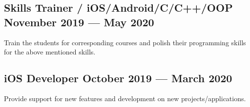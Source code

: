 \documentclass[letter,10pt]{article}
\begin{document}
\subsection{{Skills Trainer / iOS/Android/C/C++/OOP \hfill November 2019 --- May 2020}}
\begin{zitemize}
\item Train the students for corresponding courses and polish their programming skills for the above mentioned skills.
\end{zitemize}

\subsection{{iOS Developer \hfill October 2019 --- March 2020}}
\begin{zitemize}
\item Provide support for new features and development on new projects/applications.
\end{zitemize}

\end{document}
